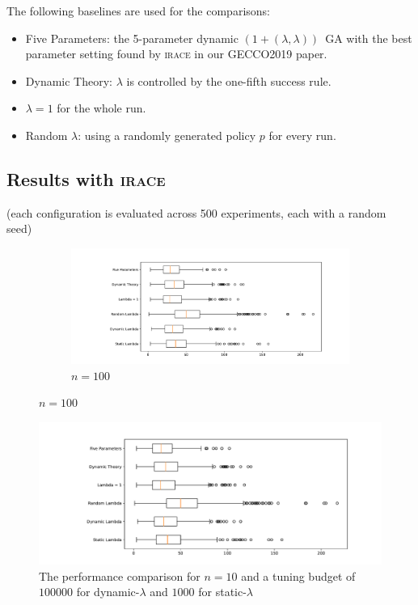\documentclass{article}
\newcommand{\opll}{$(1+(\lambda,\lambda))$~GA\xspace}
\newcommand{\irace}{\textsc{irace}\xspace}
\begin{document}
The following baselines are used for the comparisons:
\begin{itemize}
    \item Five Parameters: the 5-parameter dynamic \opll with the best parameter setting found by \irace in our GECCO2019 paper.
    \item Dynamic Theory: $\lambda$ is controlled by the one-fifth success rule.
    \item $\lambda=1$ for the whole run.
    \item Random $\lambda$: using a randomly generated policy $p$ for every run.
\end{itemize}

\subsection{Results with \irace}

(each configuration is evaluated across 500 experiments, each with a random seed)

\begin{figure}[t]
    \centering
    \begin{subfigure}{0.65\linewidth}
    \includegraphics[width=\linewidth]{box_plot_10_100_10000.pdf}
    \caption{$n=100$}
    \end{subfigure}
    \label{fig:graded_comparison}
\end{figure}

\begin{figure}[ht]
    \centering
        \includegraphics[width=1.0\textwidth]{box_plot_10_100_10000.pdf}
        \caption{The performance comparison for $n = 10$ and a tuning budget of $100000$ for dynamic-$\lambda$ and $1000$ for static-$\lambda$}
        \label{box_plot_10_100_10000}
\end{figure}
\end{document}
